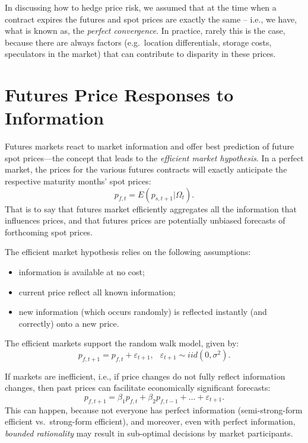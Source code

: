 \documentclass[
  oneside]{book}
\providecommand{\tightlist}{%
  \setlength{\itemsep}{0pt}\setlength{\parskip}{0pt}}
\begin{document}
In discussing how to hedge price risk, we assumed that at the time when a contract expires the futures and spot prices are exactly the same -- i.e., we have, what is known as, the \emph{perfect convergence}. In practice, rarely this is the case, because there are always factors (e.g.~location differentials, storage costs, speculators in the market) that can contribute to disparity in these prices.

\hypertarget{futures-price-responses-to-information}{%
\section{Futures Price Responses to Information}\label{futures-price-responses-to-information}}

Futures markets react to market information and offer best prediction of future spot prices---the concept that leads to the \emph{efficient market hypothesis}. In a perfect market, the prices for the various futures contracts will exactly anticipate the respective maturity months' spot prices: \[p_{f,t} = E\!\left(p_{s,t+1}|\Omega_t\right).\] That is to say that futures market efficiently aggregates all the information that influences prices, and that futures prices are potentially unbiased forecasts of forthcoming spot prices.

The efficient market hypothesis relies on the following assumptions:

\begin{itemize}
\tightlist
\item
  information is available at no cost;
\item
  current price reflect all known information;
\item
  new information (which occurs randomly) is reflected instantly (and correctly) onto a new price.
\end{itemize}

The efficient markets support the random walk model, given by: \[p_{f,t+1} = p_{f,t} + \varepsilon_{t+1},\;~~\varepsilon_{t+1}\sim iid\left(0,\sigma^2\right).\]

If markets are inefficient, i.e., if price changes do not fully reflect information changes, then past prices can facilitate economically significant forecasts: \[p_{f,t+1} = \beta_1 p_{f,t} + \beta_2 p_{f,t-1} + \ldots + \varepsilon_{t+1}.\] This can happen, because not everyone has perfect information (semi-strong-form efficient vs.~strong-form efficient), and moreover, even with perfect information, \emph{bounded rationality} may result in sub-optimal decisions by market participants.
\end{document}
